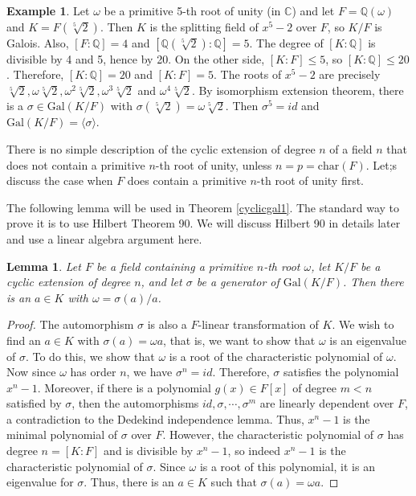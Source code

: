 \documentclass[12pt]{report}
\newtheorem{lemma}[theorem]{Lemma}
\theoremstyle{definition}
\newtheorem{example}[theorem]{Example}
\newcommand{\charr}{\text{char}}
\newcommand{\Gal}{\text{Gal}}
\newcommand{\CC}{\mathbb{C}}
\newcommand{\QQ}{\mathbb{Q}}
\begin{document}
\begin{example}
	Let $\omega$ be a primitive 5-th root of unity (in $\CC$) and let $F=\QQ(\omega)$ and $K=F(\sqrt[5]{2})$. Then $K$ is the splitting field of $x^5-2$ over $F$, so $K/F$ is Galois. Also, $[F:\QQ]=4$ and $[\QQ(\sqrt[5]{2}):\QQ]=5$. The degree of $[K:\QQ]$ is divisible by 4 and 5, hence by 20. On the other side, $[K:F]\leq 5$, so $[K:\QQ]\leq 20$. Therefore, $[K:\QQ]=20$ and $[K:F]=5$. The roots of $x^5-2$ are precisely $\sqrt[5]{2},\omega\sqrt[5]{2},\omega^2\sqrt[5]{2},\omega^3\sqrt[5]{2}$ and $\omega^4\sqrt[5]{2}$. By isomorphism extension theorem, there is a $\sigma\in \Gal(K/F)$ with $\sigma(\sqrt[5]{2})=\omega \sqrt[5]{2}$. Then $\sigma^5=id$ and $\Gal(K/F)=\langle \sigma\rangle$.
\end{example}

There is no simple description of the cyclic extension of degree $n$ of a field $n$ that does not contain a primitive $n$-th root of unity, unless $n=p=\charr(F)$. Let;s discuss the case when $F$ does contain a primitive $n$-th root of unity first.

The following lemma will be used in Theorem \ref{cyclicgal1}. The standard way to prove it is to use Hilbert Theorem 90. We will discuss Hilbert 90  in details later and use a linear algebra argument here.

\begin{lemma}\label{cycliclem1}
	Let $F$ be a field containing a primitive $n$-th root $\omega$, let $K/F$ be a cyclic extension of degree $n$, and let $\sigma$ be a generator of $\Gal(K/F)$. Then there is an $a\in K$ with $\omega=\sigma(a)/a$.
\end{lemma}
\begin{proof}
	The automorphism $\sigma$ is also a $F$-linear transformation of $K$. We wish to find an $a\in K$ with $\sigma(a)=\omega a$, that is, we want to show that $\omega$ is an eigenvalue of $\sigma$. To do this, we show that $\omega$ is a root of the characteristic polynomial of $\omega$. Now since $\omega$ has order $n$, we have $\sigma^n=id$. Therefore, $\sigma$ satisfies the polynomial $x^n-1$. Moreover, if there is a polynomial $g(x)\in F[x]$ of degree $m<n$ satisfied by $\sigma$, then the automorphisms $id,\sigma,\cdots,\sigma^{m}$ are linearly dependent over $F$, a contradiction to the Dedekind independence lemma. Thus, $x^n-1$ is the minimal polynomial of $\sigma$ over $F$. However, the characteristic polynomial of $\sigma$ has degree $n=[K:F]$ and is divisible by $x^n-1$, so indeed $x^n-1$ is the characteristic polynomial of $\sigma$. Since $\omega$ is a root of this polynomial, it is an eigenvalue for $\sigma$. Thus, there is an $a\in K$ such that $\sigma(a)=\omega a$.
\end{proof}
\end{document}
